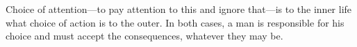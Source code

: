 \begin{savequote}[75mm]
Choice of attention---to pay attention to this and ignore that---is to the inner life what choice of action is to the outer. In both cases, a man is responsible for his choice and must accept the consequences, whatever they may be.
\end{savequote}

\label{sec:attention}





 
